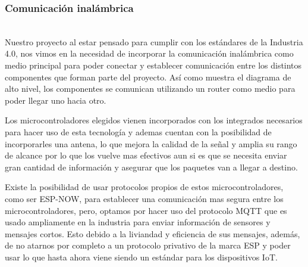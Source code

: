 \subsubsection{Comunicación inalámbrica} \mbox{} \vspace{10pt} \\
Nuestro proyecto al estar pensado para cumplir con los estándares de la Industria 4.0, nos vimos en la necesidad de incorporar la comunicación inalámbrica como medio principal para poder conectar y establecer comunicación entre los distintos componentes que forman parte del proyecto. Así como muestra el diagrama de alto nivel, los componentes se comunican utilizando un router como medio para poder llegar uno hacia otro.

Los microcontroladores elegidos vienen incorporados con los integrados necesarios para hacer uso de esta tecnología y ademas cuentan con la posibilidad de incorporarles una antena, lo que mejora la calidad de la señal y amplia su rango de alcance por lo que los vuelve mas efectivos aun si es que se necesita enviar gran cantidad de información y asegurar que los paquetes van a llegar a destino.

Existe la posibilidad de usar protocolos propios de estos microcontroladores, como ser ESP-NOW, para establecer una comunicación mas segura entre los microcontroladores, pero, optamos por hacer uso del protocolo MQTT que es usado ampliamente en la industria para enviar información de sensores y mensajes cortos. Esto debido a la liviandad y eficiencia de sus mensajes, además, de no atarnos por completo a un protocolo privativo de la marca ESP y poder usar lo que hasta ahora viene siendo un estándar para los dispositivos IoT.